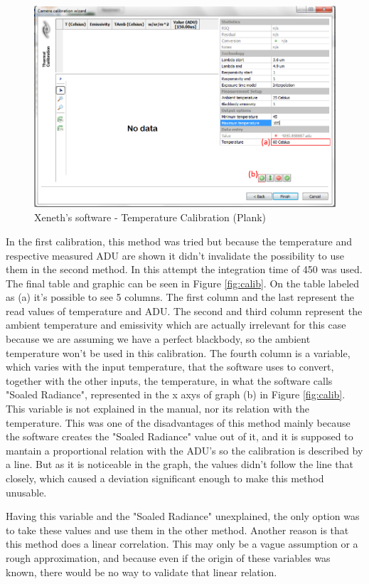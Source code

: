 \begin{figure}[h]
\centering
\includegraphics[width=0.7\linewidth]{Figures/4.Chapter/plankcalib.png}
\caption{Xeneth's software - Temperature Calibration (Plank)}
\label{fig:plankcalib}
\end{figure}

\par In the first calibration, this method was tried but because the temperature and respective measured ADU are shown it didn't invalidate the possibility to use them in the second method. In this attempt the integration time of 450 was used. The final table and graphic can be seen in Figure \ref{fig:calib}. On the table labeled as (a) it's possible to see 5 columns. The first column and the last represent the read values of temperature and ADU. The second and third column represent the ambient temperature and emissivity which are actually irrelevant for this case because we are assuming we have a perfect blackbody, so the ambient temperature won't be used in this calibration. The fourth column is a variable, which varies with the input temperature, that the software uses to convert, together with the other inputs, the temperature, in what the software calls "Soaled Radiance", represented in the x axys of graph (b) in Figure \ref{fig:calib}. This variable is not explained in the manual, nor its relation with the temperature. This was one of the disadvantages of this method mainly because the software creates the "Soaled Radiance" value out of it, and it is supposed to mantain a proportional relation with the ADU's so the calibration is described by a line. But as it is noticeable in the graph, the values didn't follow the line that closely, which caused a deviation significant enough to make this method unusable. \\

\par Having this variable and the "Soaled Radiance" unexplained, the only option was to take these values and use them in the other method. Another reason is that this method does a linear correlation. This may only be a vague assumption or a rough approximation, and because even if the origin of these variables was known, there would be no way to validate that linear relation. \\

